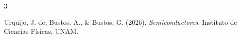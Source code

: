 \begin{thebibliography}{3}


Urquijo, J. de, Bustos, A., \& Bustos, G. (2026). \textit{Semiconductores}. Instituto de Ciencias Físicas, UNAM.

\end{thebibliography}